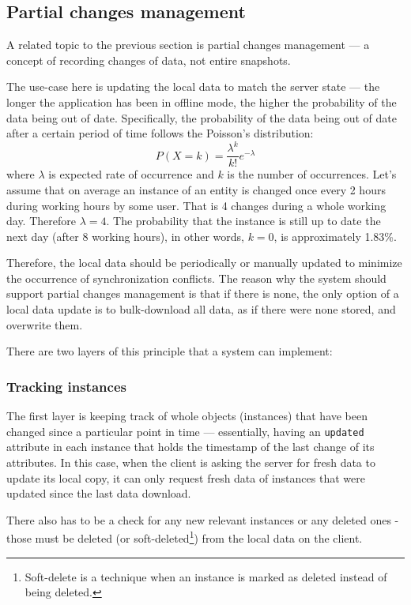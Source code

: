 \documentclass[
  digital,     %
  color,       %
  oneside,     %
  nosansbold,  %
  nocolorbold, %
  lof,         %
  lot,         %
]{fithesis4}
\begin{document}
\subsection{Partial changes management}
A related topic to the previous section is partial changes management --- a concept of recording changes of data, not entire snapshots. 

The use-case here is updating the local data to match the server state --- the longer the application has been in offline mode, the higher the probability of the data being out of date. Specifically, the probability of the data being out of date after a certain period of time follows the Poisson's distribution\cite{poissonArticle}: \begin{equation}P(X = k) = \frac{ \lambda^k }{k!} e^{-\lambda} \end{equation} where $\lambda$ is expected rate of occurrence and $k$ is the number of occurrences. Let's assume that on average an instance of an entity is changed once every 2 hours during working hours by some user. That is 4 changes during a whole working day. Therefore $\lambda = 4$. The probability that the instance is still up to date the next day (after 8 working hours), in other words, $k = 0$, is approximately 1.83\%.

Therefore, the local data should be periodically or manually updated to minimize the occurrence of synchronization conflicts. The reason why the system should support partial changes management is that if there is none, the only option of a local data update is to bulk-download all data, as if there were none stored, and overwrite them. 

There are two layers of this principle that a system can implement:

\subsubsection{Tracking instances} 
The first layer is keeping track of whole objects (instances) that have been changed since a particular point in time --- essentially, having an \texttt{updated} attribute in each instance that holds the timestamp of the last change of its attributes. In this case, when the client is asking the server for fresh data to update its local copy, it can only request fresh data of instances that were updated since the last data download. 

There also has to be a check for any new relevant instances or any deleted ones - those must be deleted (or soft-deleted\footnote{Soft-delete is a technique when an instance is marked as deleted instead of being deleted.}) from the local data on the client.
\end{document}
